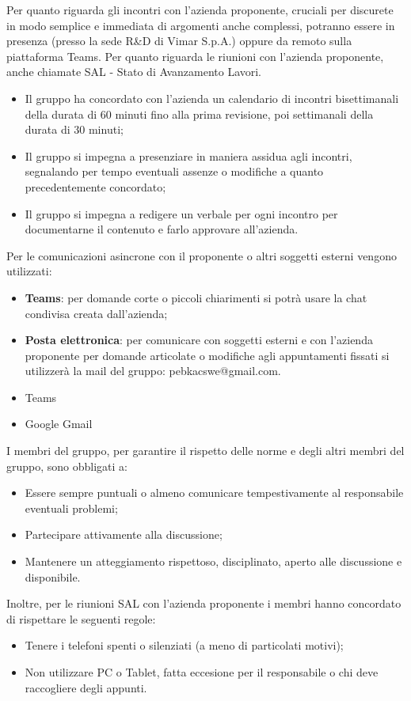 Per quanto riguarda gli incontri con l'azienda proponente, cruciali per discurete in modo semplice e immediata di argomenti anche complessi, potranno essere in presenza (presso la sede R\&D di Vimar S.p.A.) oppure da remoto sulla piattaforma Teams. Per quanto riguarda le riunioni con l'azienda proponente, anche chiamate SAL - Stato di Avanzamento Lavori.
\begin{itemize}
    \item Il gruppo ha concordato con l'azienda un calendario di incontri bisettimanali della durata di 60 minuti fino alla prima revisione, poi settimanali della durata di 30 minuti;
    \item Il gruppo si impegna a presenziare in maniera assidua agli incontri, segnalando per tempo eventuali assenze o modifiche a quanto precedentemente concordato;
    \item Il gruppo si impegna a redigere un verbale per ogni incontro per documentarne il contenuto e farlo approvare all'azienda. 
\end{itemize}
Per le comunicazioni asincrone con il proponente o altri soggetti esterni vengono utilizzati:
\begin{itemize}
    \item \textbf{Teams}: per domande corte o piccoli chiarimenti si potrà usare la chat condivisa creata dall'azienda;
    \item \textbf{Posta elettronica}: per comunicare con soggetti esterni e con l'azienda proponente per domande articolate o modifiche agli appuntamenti fissati si utilizzerà la mail del gruppo: pebkacswe@gmail.com.
\end{itemize}
\begin{itemize}
    \item Teams
    \item Google Gmail
\end{itemize}


I membri del gruppo, per garantire il rispetto delle norme e degli altri membri del gruppo, sono obbligati a:
\begin{itemize}
    \item Essere sempre puntuali o almeno comunicare tempestivamente al responsabile eventuali problemi;
    \item Partecipare attivamente alla discussione;
    \item Mantenere un atteggiamento rispettoso, disciplinato, aperto alle discussione e disponibile.
\end{itemize}
Inoltre, per le riunioni SAL con l'azienda proponente i membri hanno concordato di rispettare le seguenti regole:
\begin{itemize}
    \item Tenere i telefoni spenti o silenziati (a meno di particolati motivi);
    \item Non utilizzare PC o Tablet, fatta eccesione per il responsabile o chi deve raccogliere degli appunti.
\end{itemize}